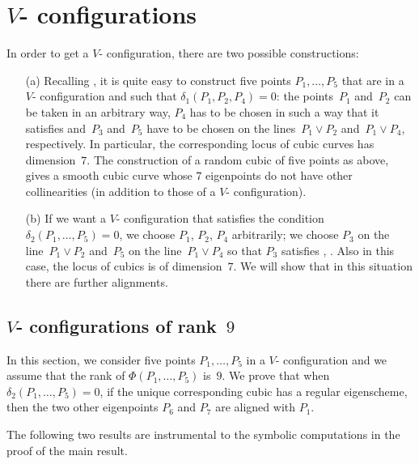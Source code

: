 \documentclass[a4paper, 11pt, reqno]{amsart}
\theoremstyle{plain}
\theoremstyle{definition}
\begin{document}
\section{\texorpdfstring{$V$}{V}- configurations}
\label{V-configurations}

In order to get a $V$- configuration, there are two possible constructions:
%
\begin{itemize}
    \item[(a)] Recalling , it is quite easy to construct five points $P_1, \dots, P_5$ that are in a $V$- configuration
and such that $\delta_1(P_1, P_2, P_4)= 0$: the points~$P_1$
and~$P_2$ can be taken in an arbitrary way, $P_4$ has to be chosen in such
a way that it satisfies 
and~$P_3$ and~$P_5$ have to be chosen on the lines~$P_1 \vee P_2$ and~$P_1 \vee P_4$,
respectively. In particular, the corresponding locus of cubic curves
has dimension~$7$.
The construction of a random cubic
of five points as above, gives a smooth cubic curve whose $7$ eigenpoints
do not have other collinearities (in addition to those of a
$V$- configuration).
    \item[(b)] If we want a $V$- configuration that satisfies the condition
$\delta_2(P_1, \dots, P_5) = 0$, we choose $P_1$, $P_2$, $P_4$ arbitrarily;
we choose $P_3$ on the line~$P_1 \vee P_2$ and~$P_5$ on the line~$P_1 \vee P_4$ so that $P_3$ satisfies , .
Also in this case, the locus of cubics is of dimension~$7$.
We will show that in this situation there are further alignments.
\end{itemize}

\subsection{\texorpdfstring{$V$}{V}- configurations of rank~\texorpdfstring{$9$}{9}}
\label{rank_9}

In this section, we consider five points $P_1, \dots, P_5$ in a $V$- configuration and we assume that the rank of $\Phi(P_1, \dots, P_5)$ is~$9$.
We prove that when $\delta_2(P_1, \dotsc, P_5) = 0$, if the unique corresponding cubic has a regular eigenscheme, then the two other eigenpoints $P_6$ and $P_7$ are aligned with $P_1$.

The following two results are instrumental to the symbolic computations in the proof of the main result.
\end{document}
